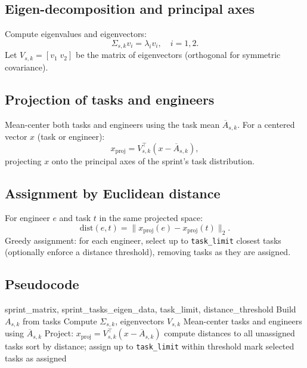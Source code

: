 \documentclass[journal]{IEEEtran}
\begin{document}
\subsection{Eigen-decomposition and principal axes}
Compute eigenvalues and eigenvectors:
\[
\Sigma_{s,k} v_i = \lambda_i v_i, \quad i=1,2.
\]
Let $V_{s,k} = [v_1 \; v_2]$ be the matrix of eigenvectors (orthogonal for symmetric covariance).

\subsection{Projection of tasks and engineers}
Mean-center both tasks and engineers using the task mean $\overline{A}_{s,k}$. For a centered vector $x$ (task or engineer):
\begin{equation}
\label{eq:proj}
x_{\text{proj}} = V_{s,k}^\top (x - \overline{A}_{s,k}),
\end{equation}
projecting $x$ onto the principal axes of the sprint's task distribution.

\subsection{Assignment by Euclidean distance}
For engineer $e$ and task $t$ in the same projected space:
\begin{equation}
\label{eq:euclid}
\mathrm{dist}(e,t) = \| x_{\text{proj}}(e) - x_{\text{proj}}(t) \|_2.
\end{equation}
Greedy assignment: for each engineer, select up to \texttt{task\_limit} closest tasks (optionally enforce a distance threshold), removing tasks as they are assigned.

\subsection{Pseudocode}
\begin{algorithm}[H]
\caption{Sprint-level projection and assignment}
\label{alg:assign}
\begin{algorithmic}[1]
\Require sprint\_matrix, sprint\_tasks\_eigen\_data, task\_limit, distance\_threshold
    \State Build $A_{s,k}$ from tasks
    \State Compute $\Sigma_{s,k}$, eigenvectors $V_{s,k}$
    \State Mean-center tasks and engineers using $\overline{A}_{s,k}$
    \State Project: $x_{\text{proj}} = V_{s,k}^\top (x - \overline{A}_{s,k})$
      \State compute distances to all unassigned tasks
      \State sort by distance; assign up to \texttt{task\_limit} within threshold
      \State mark selected tasks as assigned
    \EndFor
  \EndFor
\EndFor
\end{algorithmic}
\end{algorithm}
\end{document}
